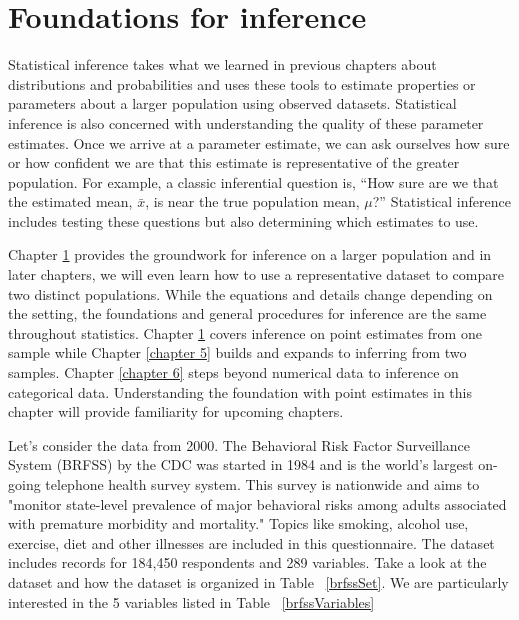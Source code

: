 \chapter{Foundations for inference}
\label{foundationsForInference}

Statistical inference takes what we learned in previous chapters about distributions and probabilities and uses these tools to estimate properties or parameters about a larger population using observed datasets. Statistical inference is also concerned with understanding the quality of these parameter estimates. Once we arrive at a parameter estimate, we can ask ourselves how sure or how confident we are that this estimate is representative of the greater population. For example, a classic inferential question is, ``How sure are we that the estimated mean, $\bar{x}$, is near the true population mean, $\mu$?'' Statistical inference includes testing these questions but also determining which estimates to use.

Chapter \ref {foundationsForInference} provides the groundwork for inference on a larger population and in later chapters, we will even learn how to use a representative dataset to compare two distinct populations. While the equations and details change depending on the setting, the foundations and general procedures for inference are the same throughout statistics. Chapter \ref{foundationsForInference} covers inference on point estimates from one sample while Chapter \ref{chapter 5} builds and expands to inferring from two samples. Chapter \ref{chapter 6} steps beyond numerical data to inference on categorical data. Understanding the foundation with point estimates in this chapter will provide familiarity for upcoming chapters. 

Let's consider the  data from 2000. The Behavioral Risk Factor Surveillance System (BRFSS) by the CDC was started in 1984 and is the world's largest on-going telephone health survey system. This survey is nationwide and aims to "monitor state-level prevalence of major behavioral risks among adults associated with premature morbidity and mortality." Topics like smoking, alcohol use, exercise, diet and other illnesses are included in this questionnaire. The dataset includes records for 184,450 respondents and 289 variables. Take a look at the  dataset and how the dataset is organized in Table ~\ref{brfssSet}. We are particularly interested in the 5 variables listed in Table ~\ref{brfssVariables}

